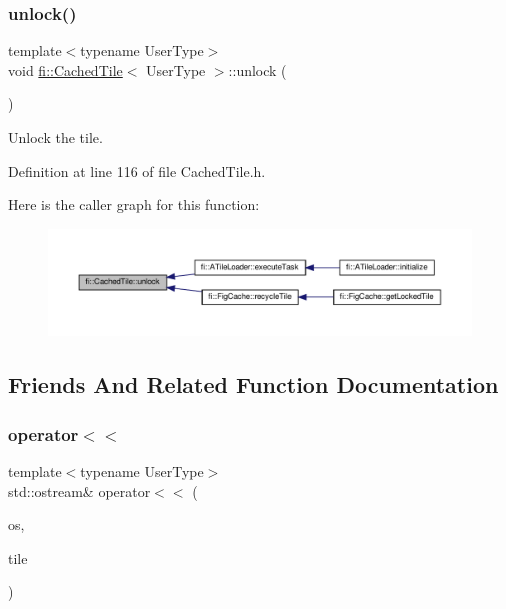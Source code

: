 \subsubsection{\texorpdfstring{unlock()}{unlock()}}
{\footnotesize\ttfamily template$<$typename User\+Type$>$ \\
void \hyperlink{classfi_1_1CachedTile}{fi\+::\+Cached\+Tile}$<$ User\+Type $>$\+::unlock (\begin{DoxyParamCaption}{ }\end{DoxyParamCaption})\hspace{0.3cm}{\ttfamily [inline]}}



Unlock the tile. 



Definition at line 116 of file Cached\+Tile.\+h.

Here is the caller graph for this function\+:
\nopagebreak
\begin{figure}[H]
\begin{center}
\leavevmode
\includegraphics[width=350pt]{d0/dbc/classfi_1_1CachedTile_a2ea14c7fc1599f72a5d725ae7983457d_icgraph}
\end{center}
\end{figure}


\subsection{Friends And Related Function Documentation}
\mbox{\label{classfi_1_1CachedTile_ad9cf6881c370368b2c7658e6527b3d51}} 
\subsubsection{\texorpdfstring{operator$<$$<$}{operator<<}}
{\footnotesize\ttfamily template$<$typename User\+Type$>$ \\
std\+::ostream\& operator$<$$<$ (\begin{DoxyParamCaption}\item[{std\+::ostream \&}]{os,  }\item[{const \hyperlink{classfi_1_1CachedTile}{Cached\+Tile}$<$ User\+Type $>$ \&}]{tile }\end{DoxyParamCaption})\hspace{0.3cm}{\ttfamily [friend]}}



